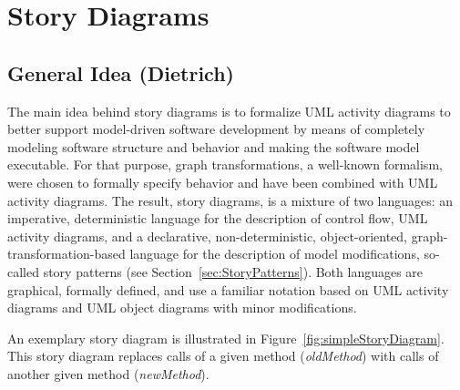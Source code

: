 \section{Story Diagrams} \label{sec:StoryDiagrams}

\subsection{General Idea (Dietrich)}


The main idea behind story diagrams is to formalize UML activity diagrams
to better support model-driven software development
by means of completely modeling software structure and behavior and making the software model executable.
For that purpose, graph transformations, a well-known formalism, were chosen to formally specify behavior and have been combined with UML activity diagrams.
The result, story diagrams, is a mixture of two languages:
an imperative, deterministic language for the description of control flow, UML activity diagrams,
and a declarative, non-deterministic, object-oriented, graph-transformation-based language for the description of model modifications, so-called story patterns (see Section~\ref{sec:StoryPatterns}).
Both languages are graphical, formally defined, and use a familiar notation based on UML activity diagrams  and UML object diagrams with minor modifications.

An exemplary story diagram is illustrated in Figure~\ref{fig:simpleStoryDiagram}.
This story diagram replaces calls of a given method (\emph{oldMethod}) with calls of another given method (\emph{newMethod}).

